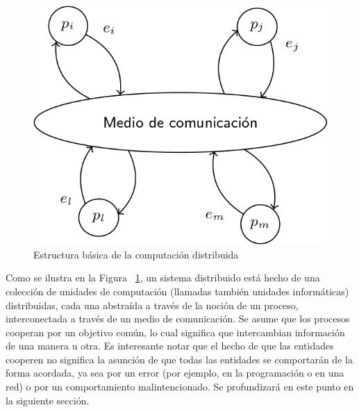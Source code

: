 \begin{figure}
  \centering
  \includegraphics[scale=0.25]{figures/distributed-systems.png}
  \caption{Estructura básica de la computación distribuida}
  \label{fig:distributed-systems}
\end{figure}


Como se ilustra en la Figura ~\ref{fig:distributed-systems}, un sistema distribuido está hecho de una
colección de unidades de computación (llamadas también unidades informáticas) distribuidas, cada una
abstraída a través de la noción de un proceso, interconectada a través de un medio de comunicación.
Se asume que los procesos cooperan por un objetivo común, lo cual significa que intercambian
información de una manera u otra. Es interesante notar que el hecho de que las entidades
cooperen no significa la asunción de que todas las entidades se comportarán de la forma
acordada, ya sea por un error (por ejemplo, en la programación o en una red) o por un comportamiento
malintencionado.
Se profundizará en este punto en la siguiente sección. %

